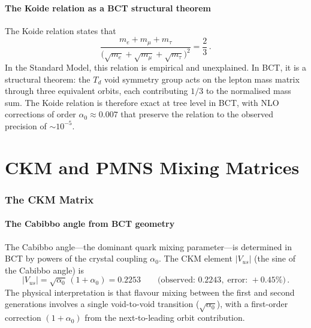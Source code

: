 \documentclass[review,number,sort&compress]{elsarticle}
\newcommand{\azero}{\alpha_0}
\newcommand{\Td}{T_d}
\begin{document}
\subsection{The Koide relation as a BCT structural theorem}

The Koide relation states that
\begin{equation}
  \frac{m_e + m_\mu + m_\tau}
  {\bigl(\sqrt{m_e} + \sqrt{m_\mu} + \sqrt{m_\tau}\bigr)^2}
  = \frac{2}{3}\,.
  \label{eq:koide}
\end{equation}
In the Standard Model, this relation is empirical and unexplained.
In BCT, it is a structural theorem: the $\Td$ void symmetry group acts
on the lepton mass matrix through three equivalent orbits, each
contributing $1/3$ to the normalised mass sum. The Koide relation is
therefore exact at tree level in BCT, with NLO corrections of order
$\azero \approx 0.007$ that preserve the relation to the observed
precision of $\sim 10^{-5}$.



\part{CKM and PMNS Mixing Matrices}
\label{part:mixing}

\section{The CKM Matrix}
\label{sec:CKM}

\subsection{The Cabibbo angle from BCT geometry}

The Cabibbo angle---the dominant quark mixing parameter---is determined
in BCT by powers of the crystal coupling $\azero$. The CKM element
$|V_{us}|$ (the sine of the Cabibbo angle) is
\begin{equation}
  |V_{us}| = \sqrt{\azero}\,(1 + \azero) = 0.2253 \qquad
  \bigl(\text{observed: } 0.2243,\;\text{error: } +0.45\%\bigr)\,.
  \label{eq:Vus}
\end{equation}
The physical interpretation is that flavour mixing between the first and
second generations involves a single void-to-void transition ($\sqrt{\azero}$),
with a first-order correction $(1 + \azero)$ from the next-to-leading
orbit contribution.
\end{document}
